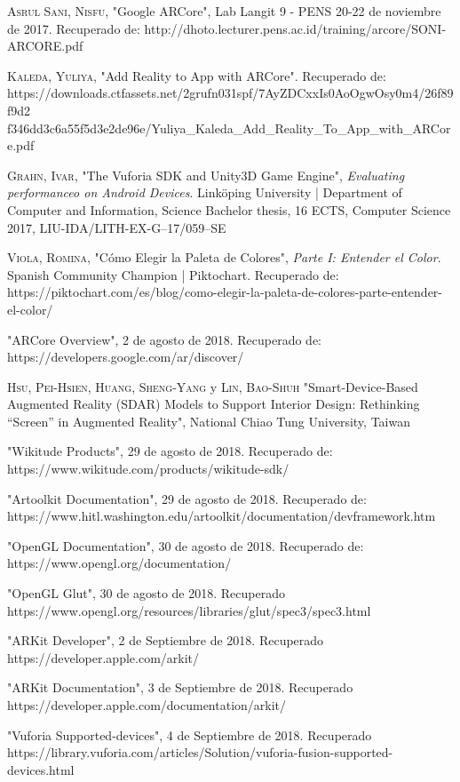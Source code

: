 \begin{thebibliography}{X}
	 \textsc{Asrul Sani, Nisfu}, "Google ARCore", Lab Langit 9 - PENS 20-22 de noviembre de 2017. Recuperado de: http://dhoto.lecturer.pens.ac.id/training/arcore/SONI-ARCORE.pdf
	
	 \textsc{Kaleda, Yuliya}, "Add Reality to App with ARCore". Recuperado de: https://downloads.ctfassets.net/2grufn031spf/7AyZDCxxIs0AoOgwOsy0m4/26f89f9d2
	f346dd3c6a55f5d3e2de96e/Yuliya\_Kaleda\_Add\_Reality\_To\_App\_with\_ARCore.pdf
	
	 \textsc{Grahn, Ivar}, "The Vuforia SDK and Unity3D Game Engine", \textit{Evaluating performanceo on Android Devices}. Linköping University | Department of Computer and Information, Science Bachelor thesis, 16 ECTS, Computer Science 2017, LIU-IDA/LITH-EX-G–17/059–SE
	
	 \textsc{Viola, Romina}, "Cómo Elegir la Paleta de Colores", \textit{Parte I: Entender el Color}. Spanish Community Champion | Piktochart. Recuperado de: https://piktochart.com/es/blog/como-elegir-la-paleta-de-colores-parte-entender-el-color/
	
	 "ARCore Overview", 2 de agosto de 2018. Recuperado de: https://developers.google.com/ar/discover/
	
	 \textsc{Hsu, Pei-Hsien}, \textsc{Huang, Sheng-Yang} y \textsc{Lin, Bao-Shuh} "Smart-Device-Based Augmented Reality (SDAR) Models to Support Interior Design: Rethinking “Screen” in Augmented Reality", National Chiao Tung University, Taiwan
	
	 "Wikitude Products", 29 de agosto de 2018. Recuperado de: https://www.wikitude.com/products/wikitude-sdk/
	
	 "Artoolkit Documentation", 29 de agosto de 2018. Recuperado de:
	https://www.hitl.washington.edu/artoolkit/documentation/devframework.htm
	
	
	 "OpenGL Documentation", 30 de agosto de 2018. Recuperado de:
	https://www.opengl.org/documentation/
	
	 "OpenGL Glut", 30 de agosto de 2018. Recuperado
	https://www.opengl.org/resources/libraries/glut/spec3/spec3.html
	
	 "ARKit Developer", 2 de Septiembre de 2018. Recuperado
	https://developer.apple.com/arkit/
	
	 "ARKit Documentation", 3 de Septiembre de 2018. Recuperado
    https://developer.apple.com/documentation/arkit/
	
	 "Vuforia Supported-devices", 4 de Septiembre de 2018. Recuperado
	https://library.vuforia.com/articles/Solution/vuforia-fusion-supported-devices.html
\end{thebibliography}
